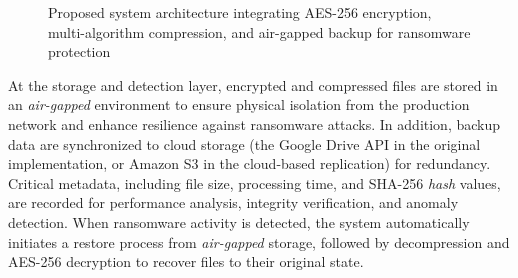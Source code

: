 \documentclass{iaesarticle}
\begin{document}
\begin{figure}[H]
\centering
{}
\vspace{.7em}
\caption{Proposed system architecture integrating AES-256 encryption, multi-algorithm compression, and air-gapped backup for ransomware protection}
\label{fig:architecture}
\end{figure}

At the storage and detection layer, encrypted and compressed files are stored in an \textit{air-gapped} environment to ensure physical isolation from the production network and enhance resilience against ransomware attacks. In addition, backup data are synchronized to cloud storage (the Google Drive API in the original implementation, or Amazon S3 in the cloud-based replication) for redundancy. Critical metadata, including file size, processing time, and SHA-256 \textit{hash} values, are recorded for performance analysis, integrity verification, and anomaly detection. When ransomware activity is detected, the system automatically initiates a restore process from \textit{air-gapped} storage, followed by decompression and AES-256 decryption to recover files to their original state.
\end{document}
